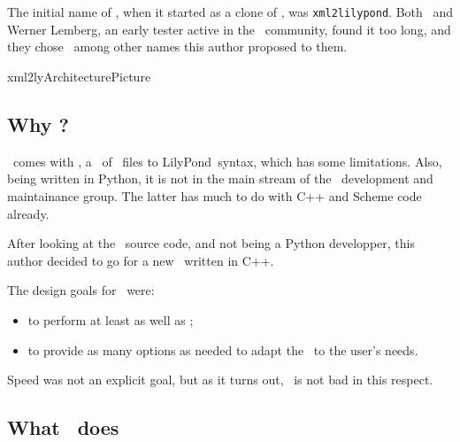 
\chapter{\xmlToLy\ }

The initial name of \xmlToLy, when it started as a clone of \xmlToGuido, was {\tt xml2lilypond}. Both \fober\ and Werner Lemberg, an early tester active in the \lily\ community, found it too long, and they chose \xmlToLy\ among other names this author proposed to them.

{xml2lyArchitecturePicture}


\section{Why \xmlToLy?}

\lily\ comes with \mxmlToLy, a \converter\ of \mxml\ files to LilyPond\ syntax, which has some limitations. Also, being written in Python, it is not in the main stream of the \lily\ development and maintainance group. The latter has much to do with C++ and Scheme code already.

After looking at the \mxmlToLy\ source code, and not being a Python developper, this author decided to go for a new \converter\ written in C++.

The design goals for \xmlToLy\ were:
\begin{itemize}
\item to perform at least as well as \mxmlToLy;
\item to provide as many options as needed to adapt the \lcg\ to the user's needs.
\end{itemize}

Speed was not an explicit goal, but as it turns out, \xmlToLy\ is not bad in this respect.


\section{What \xmlToLy\ does}

